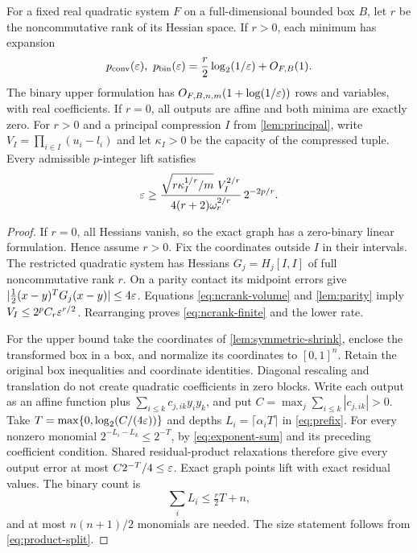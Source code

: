 \begin{theorem}\label{thm:ncrank}
For a fixed real quadratic system $F$ on a full-dimensional bounded
box $B$, let $r$ be the noncommutative rank of its Hessian space.
If $r>0$, each minimum has expansion
\begin{equation}\label{eq:ncrank-law}
 p_{\mathrm{conv}}(\varepsilon),\ p_{\mathrm{bin}}(\varepsilon)
   =\frac r2\log_2(1/\varepsilon)+O_{F,B}(1).
\end{equation}
The binary upper formulation has
$O_{F,B,n,m}(1+\log(1/\varepsilon))$ rows and variables, with real coefficients.
If $r=0$, all outputs are affine and both minima are exactly zero.
For $r>0$ and a principal compression $I$ from \cref{lem:principal}, write
$V_I=\prod_{i\in I}(u_i-l_i)$ and let $\kappa_I>0$ be the capacity of
the compressed tuple. Every admissible $p$-integer lift satisfies
\begin{equation}\label{eq:ncrank-finite}
 \varepsilon\ge
 \frac{\sqrt{r\kappa_I^{1/r}/m}\ V_I^{2/r}}
      {4(r+2)\omega_r^{2/r}}\,2^{-2p/r}.
\end{equation}
\end{theorem}
\begin{proof}
If $r=0$, all Hessians vanish, so the exact graph has a zero-binary
linear formulation. Hence assume $r>0$.
Fix the coordinates outside $I$ in their intervals. The restricted
quadratic system has Hessians $G_j=H_j[I,I]$ of full noncommutative
rank $r$. On a parity contact its midpoint errors give
$|\tfrac12(x-y)^TG_j(x-y)|\le4\varepsilon$. Equations
\eqref{eq:ncrank-volume} and \cref{lem:parity} imply
$V_I\le2^pC_r\varepsilon^{r/2}$. Rearranging proves
\eqref{eq:ncrank-finite} and the lower rate.

For the upper bound take the coordinates of
\cref{lem:symmetric-shrink}, enclose the transformed box in a box,
and normalize its coordinates to $[0,1]^n$. Retain the original box
inequalities and coordinate identities. Diagonal rescaling and
translation do not create quadratic coefficients in zero blocks.
Write each output as an affine function plus
$\sum_{i\le k}c_{j,ik}y_iy_k$, and put
$C=\max_j\sum_{i\le k}|c_{j,ik}|>0$.
Take $T=\max\{0,\log_2(C/(4\varepsilon))\}$ and depths
$L_i=\lceil\alpha_iT\rceil$ in \eqref{eq:prefix}. For every nonzero
monomial $2^{-L_i-L_k}\le2^{-T}$, by \eqref{eq:exponent-sum} and its
preceding coefficient condition. Shared residual-product relaxations
therefore give every output error at most $C2^{-T}/4\le\varepsilon$.
Exact graph points lift with exact residual values. The binary count is
\[
 \sum_iL_i\le\tfrac r2T+n,
\]
and at most $n(n+1)/2$ monomials are needed. The size statement follows
from \eqref{eq:product-split}.
\end{proof}

